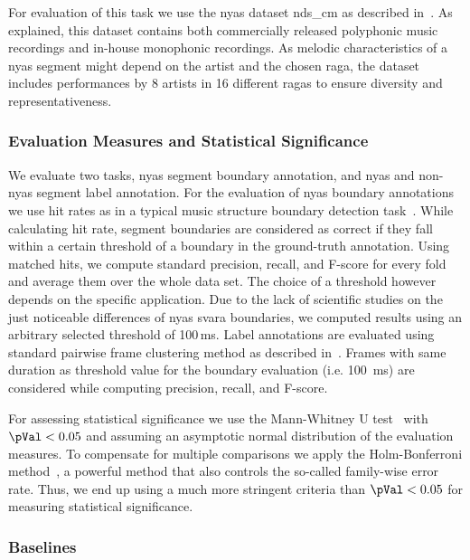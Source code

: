 {For evaluation of this task we use the \gls{nyas} dataset \acrshort{nds_cm} as described in~. As explained, this dataset contains both commercially released polyphonic music recordings and in-house monophonic recordings. As melodic characteristics of a \gls{nyas} segment might depend on the artist and the chosen \gls{raga}, the dataset includes performances by 8 artists in 16 different \glspl{raga} to ensure diversity and representativeness.

\subsubsection{Evaluation Measures and Statistical Significance}

We evaluate two tasks, \gls{nyas} segment boundary annotation, and \gls{nyas} and non-\gls{nyas} segment label annotation. For the evaluation of \gls{nyas} boundary annotations we use hit rates as in a typical music structure boundary detection task~\citep{Ong05ICMC}. While calculating hit rate, segment boundaries are considered as correct if they fall within a certain threshold of a boundary in the ground-truth annotation. Using matched hits, we compute standard precision, recall, and F-score for every fold and average them over the whole data set. The choice of a threshold however depends on the specific application. Due to the lack of scientific studies on the just noticeable differences of \gls{nyas} \gls{svara} boundaries, we computed results using an arbitrary selected threshold of 100\,ms. Label annotations are evaluated using standard pairwise frame clustering method as described in~\cite{levy2008structural}. Frames with same duration as threshold value for the boundary evaluation (i.e. 100~ms) are considered while computing precision, recall, and F-score. 

For assessing statistical significance we use the Mann-Whitney U test~\citep{mann1947test} with $\pVal<0.05$ and assuming an asymptotic normal distribution of the evaluation measures. To compensate for multiple comparisons we apply the Holm-Bonferroni method~\citep{holm1979simple}, a powerful method that also controls the so-called family-wise error rate. Thus, we end up using a much more stringent criteria than $\pVal<0.05$ for measuring statistical significance.

\subsubsection{Baselines}

}
